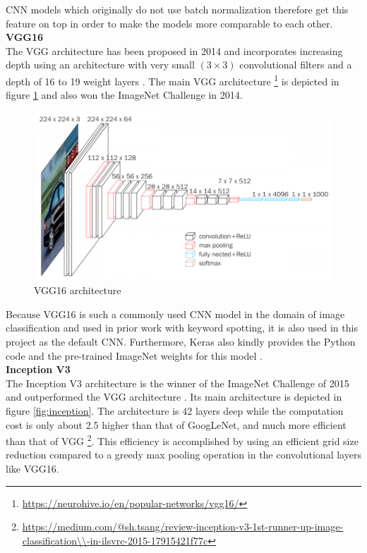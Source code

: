 \documentclass{article}
\theoremstyle{definition}
\theoremstyle{remark}
\begin{document}
CNN models which originally do not use batch normalization therefore get this feature on top in order to make the models more comparable to each other.\\


\noindent\textbf{VGG16}\\

The VGG architecture has been proposed in 2014 and incorporates increasing depth using an architecture with very small $(3 \times 3)$ convolutional filters and a depth of 16 to 19 weight layers \cite{simonyan2014very}. The main VGG architecture \footnote{\url{https://neurohive.io/en/popular-networks/vgg16/}} is depicted in figure \ref{fig:vgg16_architecture} and also won the ImageNet Challenge in 2014.

\begin{figure}[h!]
    \centering
    \includegraphics[width=1\textwidth]{img/vgg16_architecture.png}
    \caption[VGG16 architecture]{VGG16 architecture}
    \label{fig:vgg16_architecture}
\end{figure}

Because VGG16 is such a commonly used CNN model in the domain of image classification and used in prior work with keyword spotting, it is also used in this project as the default CNN. Furthermore, Keras also kindly provides the Python code and the pre-trained ImageNet weights for this model \cite{vgg16_impl}.\\




\noindent\textbf{Inception V3}\\

The Inception V3 architecture is the winner of the ImageNet Challenge of 2015 and outperformed the VGG architecture \cite{szegedy2016rethinking}. Its main architecture is depicted in figure \ref{fig:inception}. The architecture is 42 layers deep while the computation cost is only about 2.5 higher than that of GoogLeNet, and much more efficient than that of VGG  \footnote{\url{https://medium.com/@sh.tsang/review-inception-v3-1st-runner-up-image-classification\\-in-ilsvrc-2015-17915421f77c}}. This efficiency is accomplished by using an efficient grid size reduction compared to a greedy max pooling operation in the convolutional layers like VGG16.
\end{document}
